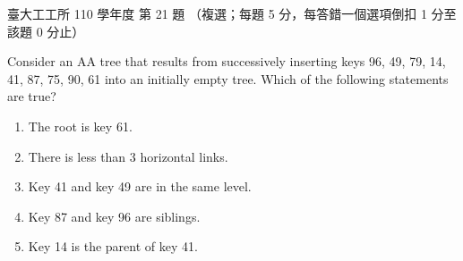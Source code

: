 \begin{pastexam}[label={px:ntu-110-ie-ds-21}]{臺大工工所 110 學年度 第 21 題}
（複選；每題 5 分，每答錯一個選項倒扣 1 分至該題 0 分止）

Consider an AA tree that results from successively inserting keys 96, 49, 79, 14, 41, 87, 75, 90, 61 into
an initially empty tree. Which of the following statements are true?
\begin{enumerate}[label=(\Alph*)]
\item The root is key 61.
\item There is less than 3 horizontal links.
\item Key 41 and key 49 are in the same level.
\item Key 87 and key 96 are siblings.
\item Key 14 is the parent of key 41.
\end{enumerate}
\end{pastexam}

